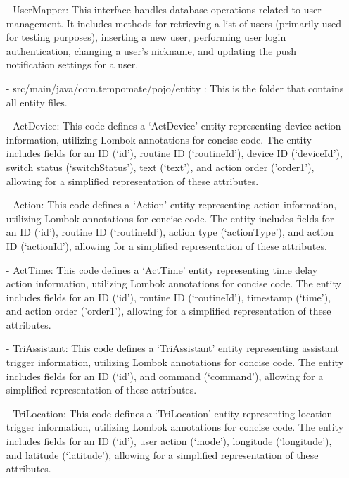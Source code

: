 \begin{enumerate}[label=\arabic*]
\begin{enumerate}[label=\alph*]
\begin{enumerate}
                \item[-] UserMapper: This interface handles database operations related to user management. It includes methods for retrieving a list of users (primarily used for testing purposes), inserting a new user, performing user login authentication, changing a user's nickname, and updating the push notification settings for a user. \\
                \item[-] src/main/java/com.tempomate/pojo/entity : This is the folder that contains all entity files. \\
                \item[-] ActDevice: This code defines a ‘ActDevice' entity representing device action information, utilizing Lombok annotations for concise code. The entity includes fields for an ID (‘id’), routine ID (‘routineId’), device ID (‘deviceId’), switch status (‘switchStatus’), text (‘text’), and action order ('order1'), allowing for a simplified representation of these attributes.\\
                \item[-] Action: This code defines a ‘Action' entity representing action information, utilizing Lombok annotations for concise code. The entity includes fields for an ID (‘id’), routine ID (‘routineId’), action type (‘actionType’), and action ID (‘actionId’), allowing for a simplified representation of these attributes. \\
                \item[-] ActTime: This code defines a ‘ActTime' entity representing time delay action information, utilizing Lombok annotations for concise code. The entity includes fields for an ID (‘id’), routine ID (‘routineId’), timestamp (‘time’), and action order ('order1'), allowing for a simplified representation of these attributes.\\
                \item[-] TriAssistant: This code defines a ‘TriAssistant' entity representing assistant trigger information, utilizing Lombok annotations for concise code. The entity includes fields for an ID (‘id’), and command (‘command’), allowing for a simplified representation of these attributes.\\
                \item[-] TriLocation: This code defines a ‘TriLocation' entity representing location trigger information, utilizing Lombok annotations for concise code. The entity includes fields for an ID (‘id’), user action (‘mode’), longitude (‘longitude’), and latitude (‘latitude’), allowing for a simplified representation of these attributes.\\

\end{enumerate}
\end{enumerate}
\end{enumerate}
